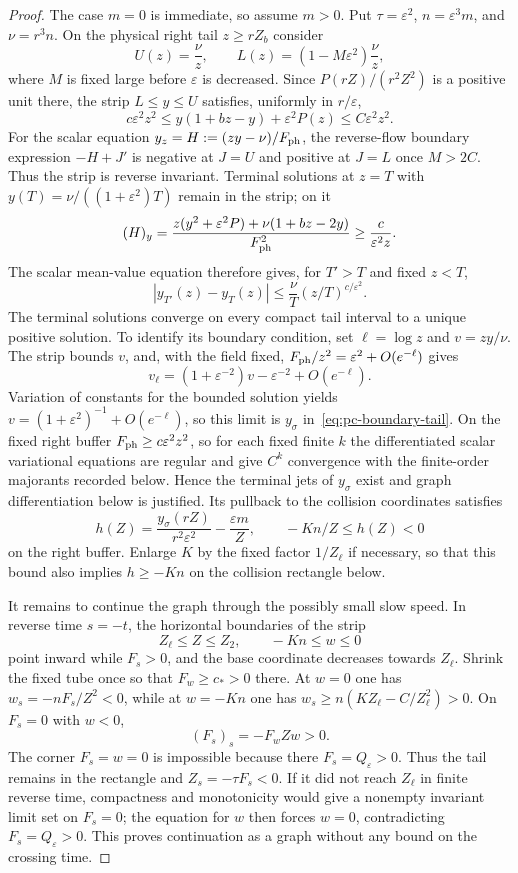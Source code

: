 \begin{proof}
The case $m=0$ is immediate, so assume $m>0$.
Put $\tau=\varepsilon^2$, $n=\varepsilon^3m$, and
$\nu=r^3n$.  On the physical right tail $z\ge rZ_b$ consider
\[
 U(z)=\frac{\nu}{z},\qquad
 L(z)=(1-M\varepsilon^2)\frac{\nu}{z},
\]
where $M$ is fixed large before $\varepsilon$ is decreased.  Since
$P(rZ)/(r^2Z^2)$ is a positive unit there, the strip $L\le y\le U$
satisfies, uniformly in $r/\varepsilon$,
\[
 c\varepsilon^2z^2\le
 y(1+bz-y)+\varepsilon^2P(z)\le C\varepsilon^2z^2.
\]
For the scalar equation $y_z=H:=(zy-\nu)/F_{\rm ph}$, the reverse-flow
boundary expression $-H+J'$ is negative at $J=U$ and positive at
$J=L$ once $M>2C$.  Thus the strip is reverse invariant.  Terminal
solutions at $z=T$ with
$y(T)=\nu/((1+\varepsilon^2)T)$ remain in the strip; on it
\[
 (H)_y=
 \frac{z(y^2+\varepsilon^2P)+\nu(1+bz-2y)}{F_{\rm ph}^2}
 \ge\frac{c}{\varepsilon^2z}.
\]
The scalar mean-value equation therefore gives, for $T'>T$ and fixed
$z<T$,
\[
 |y_{T'}(z)-y_T(z)|\le \frac{\nu}{T}(z/T)^{c/\varepsilon^2}.
\]
The terminal solutions converge on every compact tail interval to a unique
positive solution. To identify its boundary condition, set $\ell=\log z$
and $v=zy/\nu$. The strip bounds $v$, and, with the field fixed,
$F_{\rm ph}/z^2=\varepsilon^2+O(e^{-\ell})$ gives
\[
 v_\ell=(1+\varepsilon^{-2})v-\varepsilon^{-2}+O(e^{-\ell}).
\]
Variation of constants for the bounded solution yields
$v=(1+\varepsilon^2)^{-1}+O(e^{-\ell})$, so this limit is
$y_\sigma$ in~\eqref{eq:pc-boundary-tail}. On the fixed right buffer
$F_{\rm ph}\ge c\varepsilon^2z^2$, so for each fixed finite $k$ the
differentiated scalar variational equations are regular and give $C^k$
convergence with the finite-order majorants recorded below.  Hence the
terminal jets of $y_\sigma$ exist and graph differentiation below is
justified.  Its pullback to the
collision coordinates satisfies
\[
h(Z)=\frac{y_\sigma(rZ)}{r^2\varepsilon^2}-\frac{\varepsilon m}{Z},
 \qquad -K n/Z\le h(Z)<0
\]
on the right buffer.  Enlarge $K$ by the fixed factor $1/Z_\ell$ if
necessary, so that this bound also implies $h\ge-Kn$ on the collision
rectangle below.

It remains to continue the graph through the possibly small slow speed.
In reverse time $s=-t$, the horizontal boundaries of the strip
\[
 Z_\ell\le Z\le Z_2,\qquad -Kn\le w\le0
\]
point inward while $F_s>0$, and the base coordinate decreases towards
$Z_\ell$.  Shrink the fixed tube once so that
$F_w\ge c_*>0$ there.  At $w=0$ one has
$w_s=-nF_s/Z^2<0$, while at $w=-Kn$ one has
$w_s\ge n(KZ_\ell-C/Z_\ell^2)>0$. On $F_s=0$ with $w<0$,
\[
 (F_s)_s=-F_wZw>0.
\]
The corner $F_s=w=0$ is impossible because there
$F_s=Q_\varepsilon>0$.  Thus the tail remains in the rectangle and
$Z_s=-\tau F_s<0$. If it did not reach $Z_\ell$ in finite reverse time,
compactness and monotonicity would give a nonempty invariant limit set on
$F_s=0$; the equation for $w$ then forces $w=0$, contradicting
$F_s=Q_\varepsilon>0$.  This proves continuation as a graph without any
bound on the crossing time.


\end{proof}
